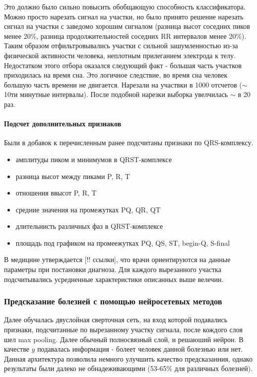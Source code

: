 Это должно было сильно повысить обобщающую способность классификатора. Можно просто нарезать сигнал на участки, но было принято решение нарезать сигнал на участки с заведомо хорошим сигналом (разница высот соседних пиков менее 20\%, разница продолжительностей соседних RR интервалов менее 20\%). Таким образом отфильтровывались участки с сильной зашумленностью из-за физической активности человека, неплотным прилеганием электрода к телу. Недостатком этого отбора оказался следующий факт - большая часть участков приходилась на время сна. Это логичное следствие, во время сна человек большую часть времени не двигается. Нарезали на участвки в 1000 отсчетов ($\sim$ 10ти минутные интервалы). После подобной нарезки выборка увелчилась $\sim$ в 20 раз.

\paragraph{Подсчет дополнительных признаков}

Были в добавок к перечисленным ранее подсчитаны признаки по QRS-комплексу.

\begin{itemize}
	\item амплитуды пиком и минимумов в QRST-комплексе
	\item разница высот между пиками P, R, T
	\item отношения ввысот P, R, T
	\item средние значения на промежутках PQ, QR, QT
	\item длительнисть различных фаз в QRST-комплексе
	\item площадь под графиком на промеежутках PQ, QS, ST, begin-Q, S-final
\end{itemize}

В медицине утверждается [!! ссылки], что врачи ориентируются на данные параметры при постановки диагноза.
Для каждого вырезанного участка подсчитывались усредненные характеристики описанных выше велечин.

\subsubsection{Предсказание болезней с помощью нейросетевых методов}

Далее обучалась двуслойная сверточная сеть, на вход которой подавались признаки, подсчитанные по вырезанному участку сигнала, после кождого слоя шел max pooling. Далее обычный полносвязный слой, и решаюший нейрон. В качестве $y$ подавалась информация - болеет человек данной болезнью или нет. Данная архитектура позволила немного улучшить качество предсказанния, однако результаты были далеко не обнадеживающими (53-65\% для различных болезней).

